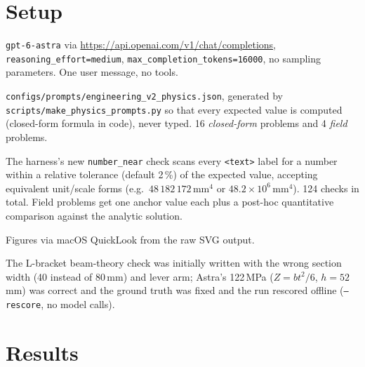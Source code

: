 \documentclass[11pt,a4paper]{article}
\begin{document}
\section{Setup}
\begingroup\raggedright
\begin{description}[style=nextline,leftmargin=2em]
  \item[Model] \texttt{gpt-6-astra} via \url{https://api.openai.com/v1/chat/completions}, \texttt{reasoning\_effort=medium}, \texttt{max\_completion\_tokens=16000}, no sampling parameters. One user message, no tools.
  \item[Prompt set] \texttt{configs/prompts/engineering\_v2\_physics.json}, generated by \texttt{scripts/make\_physics\_prompts.py} so that every expected value is computed (closed-form formula in code), never typed. 16 \emph{closed-form} problems and 4 \emph{field} problems.
  \item[Checks] The harness's new \texttt{number\_near} check scans every \texttt{<text>} label for a number within a relative tolerance (default 2\,\%) of the expected value, accepting equivalent unit/scale forms (e.g.\ $48\,182\,172$\,mm$^4$ or $48.2\times10^6$\,mm$^4$). 124 checks in total. Field problems get one anchor value each plus a post-hoc quantitative comparison against the analytic solution.
  \item[Rendering] Figures via macOS QuickLook from the raw SVG output.
  \item[One ground-truth correction] The L-bracket beam-theory check was initially written with the wrong section width (40 instead of 80\,mm) and lever arm; Astra's 122\,MPa ($Z=bt^2/6$, $h=52$\,mm) was correct and the ground truth was fixed and the run rescored offline (\texttt{--rescore}, no model calls).
\end{description}
\endgroup

\section{Results}
\end{document}
